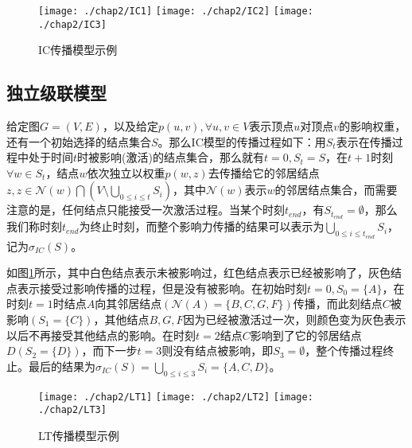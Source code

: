 \begin{figure}[H]
\centering%
	{\texttt{[image: ./chap2/IC1]}}
	\hspace{1mm}%
	{\texttt{[image: ./chap2/IC2]}}
	\hspace{1mm}%
	{\texttt{[image: ./chap2/IC3]}}
	\caption{IC传播模型示例}
	\label{fig:IC-inf-diffusion}
\end{figure}


\subsection{独立级联模型}
\label{sec:IC-model-desc}
给定图$G=(V, E)$，以及给定$p(u, v), \forall u, v \in V$表示顶点$u$对顶点$v$的影响权重，还有一个初始选择的结点集合$S$。那么IC模型的传播过程如下：用$S_{t}$表示在传播过程中处于时间$t$时被影响(激活)的结点集合，那么就有$t=0, S_{t}=S$，在$t+1$时刻$\forall w \in S_{t}$，结点$w$依次独立以权重$p(w, z)$去传播给它的邻居结点$z, z \in \mathcal{N}(w) \bigcap (V \setminus \bigcup_{0 \leq i \leq t}S_{i})$，其中$\mathcal{N}(w)$表示$w$的邻居结点集合，而需要注意的是，任何结点只能接受一次激活过程。当某个时刻$t_{end}$，有$S_{t_{end}} = \emptyset$，那么我们称时刻$t_{end}$为终止时刻，而整个影响力传播的结果可以表示为$\bigcup_{0 \leq i \leq t_{end}}S_{i}$，记为$\sigma_{IC}(S)$。


如图\ref{fig:IC-inf-diffusion}所示，其中白色结点表示未被影响过，红色结点表示已经被影响了，灰色结点表示接受过影响传播的过程，但是没有被影响。在初始时刻$t=0,S_{0}=\{A\}$，在时刻$t=1$时结点$A$向其邻居结点$(\mathcal{N}(A)=\{B, C, G, F\})$传播，而此刻结点$C$被影响$(S_{1}=\{C\})$，其他结点$B, G, F$因为已经被激活过一次，则颜色变为灰色表示以后不再接受其他结点的影响。在时刻$t=2$结点$C$影响到了它的邻居结点$D(S_{2}=\{D\})$，而下一步$t=3$则没有结点被影响，即$S_{3}=\emptyset$，整个传播过程终止。最后的结果为$\sigma_{IC}(S)=\bigcup_{0 \leq i \leq 3}S_{i}=\{A, C, D\}$。


\begin{figure}[H]
\centering%
	{\texttt{[image: ./chap2/LT1]}}
	\hspace{1mm}%
	{\texttt{[image: ./chap2/LT2]}}
	\hspace{1mm}%
	{\texttt{[image: ./chap2/LT3]}}
	\caption{LT传播模型示例}
	\label{fig:LT-inf-diffusion}
\end{figure}


